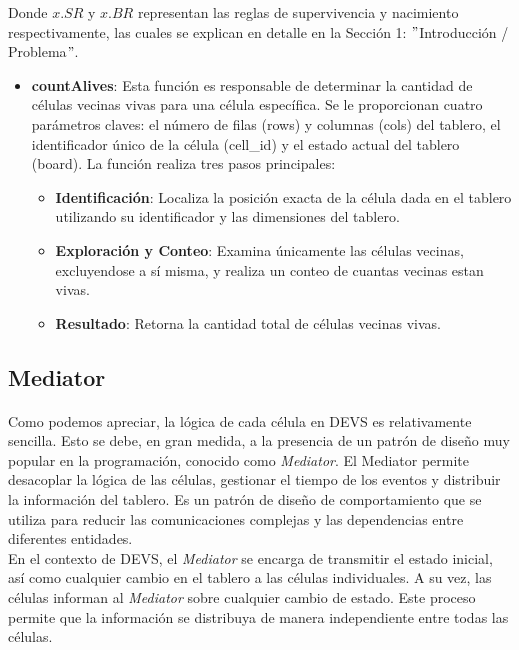 \documentclass[]{article}
\begin{document}
Donde $x.SR$ y $x.BR$ representan las reglas de supervivencia y nacimiento respectivamente, las cuales se explican en detalle en la Sección 1: $"$Introducción / Problema$"$.

\begin{itemize}
  \item \textbf{countAlives}: Esta función es responsable de determinar la cantidad de células vecinas vivas para una célula específica. Se le proporcionan cuatro parámetros claves: el número de filas (rows) y columnas (cols) del tablero, el identificador único de la célula (cell\_id) y el estado actual del tablero (board). La función realiza tres pasos principales:

        \begin{addmargin}[1em]{0em}
          \begin{itemize}
            \item \textbf{Identificación}: Localiza la posición exacta de la célula dada en el tablero utilizando su identificador y las dimensiones del tablero.
            \item \textbf{Exploración y Conteo}: Examina únicamente las células vecinas, excluyendose a sí misma, y realiza un conteo de cuantas vecinas estan vivas.
            \item \textbf{Resultado}: Retorna la cantidad total de células vecinas vivas.
          \end{itemize}
        \end{addmargin}
\end{itemize}

\subsection{Mediator}
\paragraph{}
Como podemos apreciar, la lógica de cada célula en DEVS es relativamente sencilla. Esto se debe, en gran medida, a la presencia de un patrón de diseño muy popular en la programación, conocido como \textit{Mediator}. El Mediator permite desacoplar la lógica de las células, gestionar el tiempo de los eventos y distribuir la información del tablero. Es un patrón de diseño de comportamiento que se utiliza para reducir las comunicaciones complejas y las dependencias entre diferentes entidades.\\

En el contexto de DEVS, el \textit{Mediator} se encarga de transmitir el estado inicial, así como cualquier cambio en el tablero a las células individuales. A su vez, las células informan al \textit{Mediator} sobre cualquier cambio de estado. Este proceso permite que la información se distribuya de manera independiente entre todas las células.\\
\end{document}
